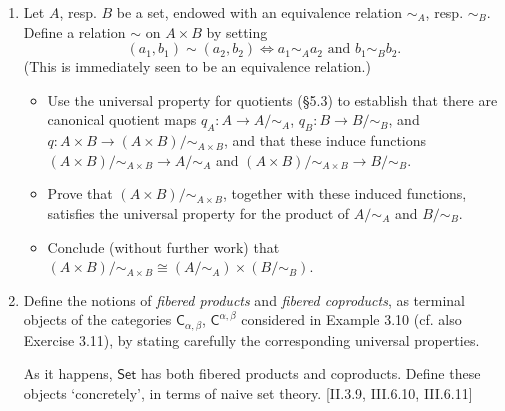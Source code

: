 \begin{enumerate}
    \item Let $A$, resp. $B$ be a set, endowed with an equivalence relation $\sim_A$, resp. $\sim_B$. Define a relation $\sim$ on $A \times B$ by setting
          \[ (a_1, b_1) \sim (a_2, b_2) \iff a_1 \sim_A a_2 \text{ and } b_1 \sim_B b_2. \]
          (This is immediately seen to be an equivalence relation.)
          \begin{itemize}
            \item Use the universal property for quotients (\S5.3) to establish that there are canonical quotient maps $q_A : A \to A/{\sim_A}$, $q_B : B \to B/{\sim_B}$, and $q : A \times B \to (A \times B)/{\sim_{A \times B}}$, and that these induce functions $(A \times B)/{\sim_{A \times B}} \to A/{\sim_A}$ and $(A \times B)/{\sim_{A \times B}} \to B/{\sim_B}$.
            \item Prove that $(A \times B)/{\sim_{A \times B}}$, together with these induced functions, satisfies the universal property for the product of $A/{\sim_A}$ and $B/{\sim_B}$.
            \item Conclude (without further work) that $(A \times B)/{\sim_{A \times B}} \cong (A/{\sim_A}) \times (B/{\sim_B})$.
          \end{itemize}

    \item Define the notions of \textit{fibered products} and \textit{fibered coproducts}, as terminal objects of the categories $\mathsf{C}_{\alpha,\beta}$, $\mathsf{C}^{\alpha,\beta}$ considered in Example 3.10 (cf. also Exercise 3.11), by stating carefully the corresponding universal properties.

          As it happens, $\mathsf{Set}$ has both fibered products and coproducts. Define these objects `concretely', in terms of naive set theory. [II.3.9, III.6.10, III.6.11]
\end{enumerate}